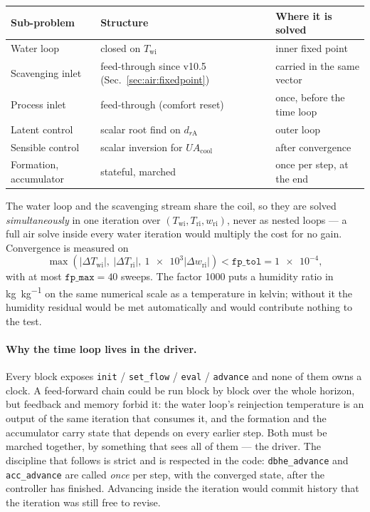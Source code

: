 \documentclass[11pt]{article}
\newcommand{\UA}{\ensuremath{U\!A}}
\begin{document}
\begin{center}
\begin{tabular}{@{}lll@{}}
\toprule
Sub-problem & Structure & Where it is solved \\
\midrule
Water loop            & closed on $T_{\mathrm{wi}}$      & inner fixed point \\
Scavenging inlet      & feed-through since v10.5 (Sec.~\ref{sec:air:fixedpoint}) & carried in the same vector \\
Process inlet         & feed-through (comfort reset)     & once, before the time loop \\
Latent control        & scalar root find on $d_{r\mathrm{A}}$ & outer loop \\
Sensible control      & scalar inversion for $\UA_{\mathrm{cool}}$ & after convergence \\
Formation, accumulator& stateful, marched                & once per step, at the end \\
\bottomrule
\end{tabular}
\end{center}

The water loop and the scavenging stream share the coil, so they are solved
\emph{simultaneously} in one iteration over
$(T_{\mathrm{wi}},T_{\mathrm{ri}},w_{\mathrm{ri}})$, never as nested loops ---
a full air solve inside every water iteration would multiply the cost for no
gain. Convergence is measured on
\begin{equation}
\max\left(\left|\Delta T_{\mathrm{wi}}\right|,\
          \left|\Delta T_{\mathrm{ri}}\right|,\
          \num{1e3}\left|\Delta w_{\mathrm{ri}}\right|\right)
< \texttt{fp\_tol} = \num{1e-4},
\label{eq:air:resid}
\end{equation}
with at most $\texttt{fp\_max}=\num{40}$ sweeps. The factor \num{1000} puts a
humidity ratio in \si{\kilogram\per\kilogram} on the same numerical scale as a
temperature in kelvin; without it the humidity residual would be met
automatically and would contribute nothing to the test.

\paragraph{Why the time loop lives in the driver.} Every block exposes
\texttt{init} / \texttt{set\_flow} / \texttt{eval} / \texttt{advance} and none
of them owns a clock. A feed-forward chain could be run block by block over the
whole horizon, but feedback and memory forbid it: the water loop's reinjection
temperature is an output of the same iteration that consumes it, and the
formation and the accumulator carry state that depends on every earlier step.
Both must be marched together, by something that sees all of them --- the
driver. The discipline that follows is strict and is respected in the code:
\texttt{dbhe\_advance} and \texttt{acc\_advance} are called \emph{once} per
step, with the converged state, after the controller has finished. Advancing
inside the iteration would commit history that the iteration was still free to
revise.
\end{document}
